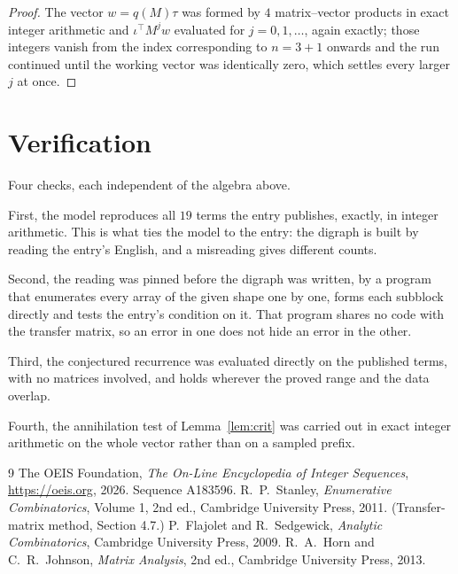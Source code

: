 \documentclass[11pt,a4paper]{article}
\theoremstyle{plain}
\theoremstyle{definition}
\begin{document}
\begin{proof}
The vector $w=q(M)\tau$ was formed by $4$ matrix--vector products in exact integer
arithmetic and $\iota^{\!\top}M^{j}w$ evaluated for $j=0,1,\dots$, again exactly; those
integers vanish from the index corresponding to $n=3+1$ onwards and the run continued
until the working vector was identically zero, which settles every larger $j$ at once.
\end{proof}

\section{Verification}

Four checks, each independent of the algebra above.

First, the model reproduces all $19$ terms the entry publishes, exactly, in integer
arithmetic. This is what ties the model to the entry: the digraph is built by reading the
entry's English, and a misreading gives different counts.

Second, the reading was pinned before the digraph was written, by a program that enumerates
every array of the given shape one by one, forms each subblock directly and tests the entry's
condition on it. That program shares no code with the transfer matrix, so an error in one does
not hide an error in the other.

Third, the conjectured recurrence was evaluated directly on the published terms, with no
matrices involved, and holds wherever the proved range and the data overlap.

Fourth, the annihilation test of Lemma~\ref{lem:crit} was carried out in exact integer
arithmetic on the whole vector rather than on a sampled prefix.

\begin{thebibliography}{9}
 The OEIS Foundation, \emph{The On-Line Encyclopedia of Integer
Sequences}, \url{https://oeis.org}, 2026. Sequence A183596.
 R.~P.~Stanley, \emph{Enumerative Combinatorics}, Volume 1, 2nd ed.,
Cambridge University Press, 2011. (Transfer-matrix method, Section 4.7.)
 P.~Flajolet and R.~Sedgewick, \emph{Analytic Combinatorics}, Cambridge
University Press, 2009.
 R.~A.~Horn and C.~R.~Johnson, \emph{Matrix Analysis}, 2nd ed., Cambridge
University Press, 2013.
\end{thebibliography}
\end{document}
